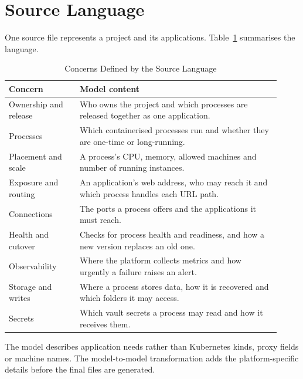 \section{Source Language}
\label{sec:sourcelanguage}

One source file represents a project and its applications.
Table~\ref{tab:source_language} summarises the language.

\begin{table}[!htbp]
\centering
\small
\begin{tabular}{>{\raggedright\arraybackslash}p{0.24\linewidth}>{\raggedright\arraybackslash}p{0.68\linewidth}}
\hline
\textbf{Concern} & \textbf{Model content} \\
\hline
Ownership and release &
  Who owns the project and which processes are released together as one application. \\
Processes &
  Which containerised processes run and whether they are one-time or long-running. \\
Placement and scale &
  A process's CPU, memory, allowed machines and number of running instances. \\
Exposure and routing &
  An application's web address, who may reach it and which process handles each URL path. \\
Connections &
  The ports a process offers and the applications it must reach. \\
Health and cutover &
  Checks for process health and readiness, and how a new version replaces an old one. \\
Observability &
  Where the platform collects metrics and how urgently a failure raises an alert. \\
Storage and writes &
  Where a process stores data, how it is recovered and which folders it may access. \\
Secrets &
  Which vault secrets a process may read and how it receives them. \\
\hline
\end{tabular}
\caption{Concerns Defined by the Source Language}
\label{tab:source_language}
\end{table}

The model describes application needs rather than Kubernetes kinds, proxy
fields or machine names. The model-to-model transformation adds the
platform-specific details before the final files are generated.
